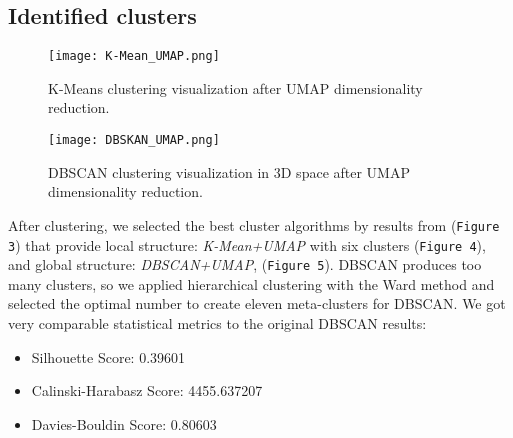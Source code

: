 \documentclass[12pt, a4paper]{article}
\begin{document}
\subsection{Identified clusters}
\begin{figure}[htbp]
  \centering
  \begin{minipage}{0.48\textwidth}
    \centering
    \texttt{[image: K-Mean\_UMAP.png]}
    \caption{K-Means clustering visualization after UMAP dimensionality reduction.}
    \label{fig:K-Mean_UMAP_plot}
  \end{minipage}
  \hfill
  \begin{minipage}{0.48\textwidth}
    \centering
    \texttt{[image: DBSKAN\_UMAP.png]}
    \caption{DBSCAN clustering visualization in 3D space after UMAP dimensionality reduction.}
    \label{fig:DBSCAN_UMAP_plot}
  \end{minipage}
\end{figure}
\hspace*{1em}
After clustering, we selected the best cluster algorithms by results from (\texttt{Figure 3}) that provide local structure: \textit{K-Mean+UMAP} with six clusters (\texttt{Figure 4}), and global structure: \textit{DBSCAN+UMAP}, (\texttt{Figure 5}). DBSCAN produces too many clusters, so we applied hierarchical clustering with the Ward method and selected the optimal number to create eleven meta-clusters for DBSCAN. We got very comparable statistical metrics to the original DBSCAN results:
\begin{itemize}
    \item Silhouette Score: 0.39601	
    \item Calinski-Harabasz Score: 4455.637207	
	\item 	Davies-Bouldin Score: 0.80603
\end{itemize}
\end{document}

